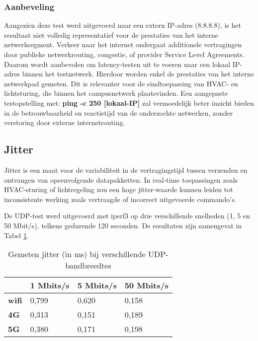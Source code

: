 \subsubsection{Aanbeveling}
Aangezien deze test werd uitgevoerd naar een extern IP-adres (8.8.8.8), is het resultaat niet volledig representatief voor de prestaties van het interne netwerksegment.
Verkeer naar het internet ondergaat additionele vertragingen door publieke netwerkrouting, congestie, of provider Service Level Agreements. Daarom wordt aanbevolen om latency-testen uit te voeren naar een lokaal IP-adres binnen het testnetwerk. Hierdoor worden  enkel de prestaties van het interne netwerkpad gemeten. Dit is relevanter voor de eindtoepassing van HVAC- en lichtsturing, die binnen het campusnetwerk plaatsvinden. Een aangepaste testopstelling met: \textbf{ping -c 250 [lokaal-IP]} zal vermoedelijk beter inzicht bieden in de betrouwbaarheid en reactietijd van de onderzochte netwerken, zonder verstoring door externe internetrouting.


\subsection{Jitter}
Jitter is een maat voor de variabiliteit in de vertragingstijd tussen verzenden en ontvangen van opeenvolgende datapakketten. In real-time toepassingen zoals HVAC-sturing of lichtregeling zou een hoge jitter-waarde kunnen leiden tot inconsistente werking zoals vertraagde of incorrect uitgevoerde commando’s.

De UDP-test werd uitgevoerd met iperf3 op drie verschillende snelheden (1, 5 en 50 Mbit/s), telkens gedurende 120 seconden. De resultaten zijn samengevat in Tabel \ref{tab:jitter}.

\begin{table}[]
    \caption{Gemeten jitter (in ms) bij verschillende UDP-bandbreedtes}
    \begin{tabular}{l l l l}
        \cline{2-4}
        & \textbf{1 Mbits/s} & \textbf{5 Mbits/s} & \textbf{50 Mbits/s} \\ \hline
        \multicolumn{1}{l}{\textbf{wifi}} & 0,799              & 0,620                 & 0,158               \\ \hline
        \multicolumn{1}{l}{\textbf{4G}}   & 0,313                & 0,151                & 0,189               \\ \hline
        \multicolumn{1}{l}{\textbf{5G}}   & 0,380               & 0,171                & 0,198               \\ \hline
    \end{tabular}
    
    \label{tab:jitter}
\end{table}

